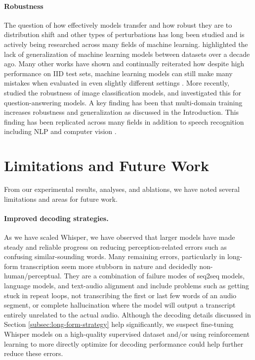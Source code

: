 \documentclass[nohyperref]{article}
\theoremstyle{plain}
\theoremstyle{definition}
\theoremstyle{remark}
\begin{document}
\paragraph{Robustness} The question of how effectively models transfer and how robust they are to distribution shift and other types of perturbations has long been studied and is actively being researched across many fields of machine learning. \citet{torralba2011databias} highlighted the lack of generalization of machine learning models between datasets over a decade ago. Many other works have shown and continually reiterated how despite high performance on IID test sets, machine learning models can still make many mistakes when evaluated in even slightly different settings \cite{lake2017building,jia2017adversarial,alcorn2019strike,barbu2019objectnet,recht2019generalize}. More recently, \citet{taori2020robustness} studied the robustness of image classification models, and \citet{miller2020nlprobustness} investigated this for question-answering models. A key finding has been that multi-domain training increases robustness and generalization as discussed in the Introduction. This finding has been replicated across many fields in addition to speech recognition including NLP \cite{hendrycks2020pretrained} and computer vision \cite{radford2021clip}.

\section{Limitations and Future Work}\label{sec:future}


From our experimental results, analyses, and ablations, we have noted several limitations and areas for future work.

\paragraph{Improved decoding strategies.} As we have scaled Whisper, we have observed that larger models have made steady and reliable progress on reducing perception-related errors such as confusing similar-sounding words. Many remaining errors, particularly in long-form transcription seem more stubborn in nature and decidedly non-human/perceptual. They are a combination of failure modes of seq2seq models, language models, and text-audio alignment and include problems such as getting stuck in repeat loops, not transcribing the first or last few words of an audio segment, or complete hallucination where the model will output a transcript entirely unrelated to the actual audio. Although the decoding details discussed in Section \ref{subsec:long-form-strategy} help significantly, we suspect fine-tuning Whisper models on a high-quality supervised dataset and/or using reinforcement learning to more directly optimize for decoding performance could help further reduce these errors.
\end{document}
